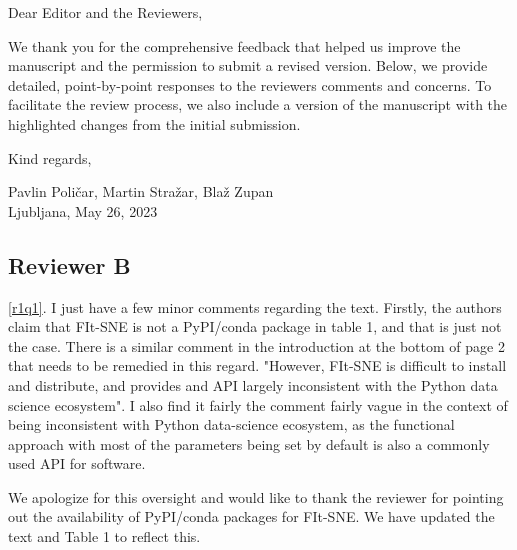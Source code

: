 \documentclass{article}
\newcounter{rtaskno}
\newcommand{\rtask}[1]{\refstepcounter{rtaskno}\label{#1}}
\newcommand{\reviewc}[2]{\begin{leftbar}\noindent\rtask{#1}\ref{#1}. #2\end{leftbar}}
\newcommand{\answer}[1]{\noindent #1\\[0mm]}
\newlength{\leftbarwidth}
\newlength{\leftbarsep}
\renewenvironment{leftbar}{%
    \def\FrameCommand{{\color{black}{\vrule width \leftbarwidth\relax\hspace {\leftbarsep}}}}%
    \MakeFramed {\advance \hsize -\width \FrameRestore }%
}{\endMakeFramed}
\begin{document}

\vspace{5mm}

\vspace{5mm}


\noindent Dear Editor and the Reviewers, \\
 
\vspace{3mm}

\noindent We thank you for the comprehensive feedback that helped us improve the manuscript and the permission to submit a revised version. Below, we provide detailed, point-by-point responses to the reviewers comments and concerns. To facilitate the review process, we also include a version of the manuscript with the highlighted changes from the initial submission.

\vspace{3mm}

\noindent Kind regards,
\vspace{3mm}

\noindent Pavlin Poli\v{c}ar, 
Martin Stra\v{z}ar, 
Bla\v{z} Zupan \\ 
\noindent Ljubljana, May 26, 2023

\vspace{10mm}


\subsection*{Reviewer B}

\reviewc{r1q1}{I just have a few minor comments regarding the text. Firstly, the authors claim that FIt-SNE is not a PyPI/conda package in table 1, and that is just not the case. There is a similar comment in the introduction at the bottom of page 2 that needs to be remedied in this regard. "However, FIt-SNE is difficult to install and distribute, and provides and API largely inconsistent with the Python data science ecosystem".  I also find it fairly the comment fairly vague in the context of being inconsistent with Python data-science ecosystem, as the functional approach with most of the parameters being set by default is also a commonly used API for software.}

\answer{
We apologize for this oversight and would like to thank the reviewer for pointing out the availability of PyPI/conda packages for FIt-SNE. We have updated the text and Table 1 to reflect this.
}
\end{document}
